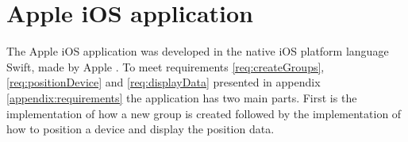 \section{Apple iOS application}\label{sec:implApp}
The Apple iOS application was developed in the native iOS platform language Swift, made by Apple \cite{SwiftOrg}.
To meet requirements \ref{req:createGroups}, \ref{req:positionDevice} and \ref{req:displayData} presented in appendix \ref{appendix:requirements} the application has two main parts.
First is the implementation of how a new group is created followed by the implementation of how to position a device and display the position data.



